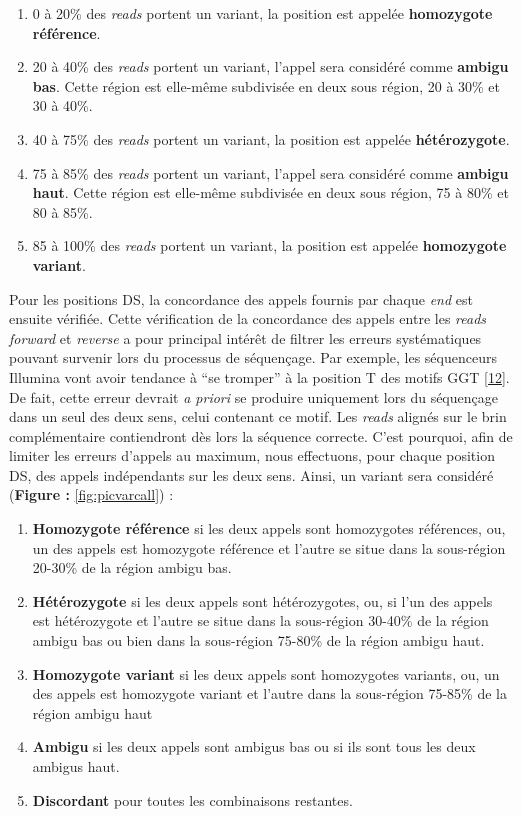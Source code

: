 \documentclass[12pt,twoside]{ugathesis}
\begin{document}
\begin{enumerate}
\def\labelenumi{\arabic{enumi}.}
\item
  0 à 20\% des \emph{reads} portent un variant, la position est appelée
  \textbf{homozygote référence}.
\item
  20 à 40\% des \emph{reads} portent un variant, l'appel sera considéré
  comme \textbf{ambigu bas}. Cette région est elle-même subdivisée en
  deux sous région, 20 à 30\% et 30 à 40\%.
\item
  40 à 75\% des \emph{reads} portent un variant, la position est appelée
  \textbf{hétérozygote}.
\item
  75 à 85\% des \emph{reads} portent un variant, l'appel sera considéré
  comme \textbf{ambigu haut}. Cette région est elle-même subdivisée en
  deux sous région, 75 à 80\% et 80 à 85\%.
\item
  85 à 100\% des \emph{reads} portent un variant, la position est
  appelée \textbf{homozygote variant}.
\end{enumerate}

Pour les positions DS, la concordance des appels fournis par chaque
\emph{end} est ensuite vérifiée. Cette vérification de la concordance
des appels entre les \emph{reads forward} et \emph{reverse} a pour
principal intérêt de filtrer les erreurs systématiques pouvant survenir
lors du processus de séquençage. Par exemple, les séquenceurs Illumina
vont avoir tendance à ``se tromper'' à la position T des motifs GGT
{[}\protect\hyperlink{ref-Robinson2011}{12}{]}. De fait, cette erreur
devrait \emph{a priori} se produire uniquement lors du séquençage dans
un seul des deux sens, celui contenant ce motif. Les \emph{reads}
alignés sur le brin complémentaire contiendront dès lors la séquence
correcte. C'est pourquoi, afin de limiter les erreurs d'appels au
maximum, nous effectuons, pour chaque position DS, des appels
indépendants sur les deux sens. Ainsi, un variant sera considéré
(\textbf{Figure : }\ref{fig:picvarcall}) :

\begin{enumerate}
\def\labelenumi{\arabic{enumi}.}
\item
  \textbf{Homozygote référence} si les deux appels sont homozygotes
  références, ou, un des appels est homozygote référence et l'autre se
  situe dans la sous-région 20-30\% de la région ambigu bas.
\item
  \textbf{Hétérozygote} si les deux appels sont hétérozygotes, ou, si
  l'un des appels est hétérozygote et l'autre se situe dans la
  sous-région 30-40\% de la région ambigu bas ou bien dans la
  sous-région 75-80\% de la région ambigu haut.
\item
  \textbf{Homozygote variant} si les deux appels sont homozygotes
  variants, ou, un des appels est homozygote variant et l'autre dans la
  sous-région 75-85\% de la région ambigu haut
\item
  \textbf{Ambigu} si les deux appels sont ambigus bas ou si ils sont
  tous les deux ambigus haut.
\item
  \textbf{Discordant} pour toutes les combinaisons restantes.
\end{enumerate}
\end{document}

